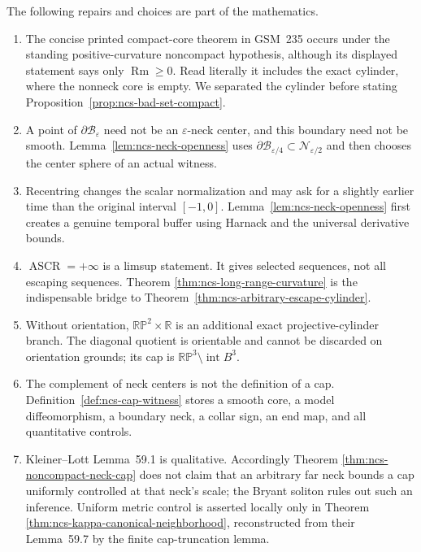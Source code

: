 \documentclass[10pt]{coll-l}
\newcommand{\R}{\mathbb{R}}
\theoremstyle{definition}
\theoremstyle{remark}
\numberwithin{section}{chapter}
\numberwithin{equation}{chapter}
\newcommand{\ASCR}{\operatorname{ASCR}}
\newcommand{\Rm}{\operatorname{Rm}}
\begin{document}
The following repairs and choices are part of the mathematics.
\begin{enumerate}
\item The concise printed compact-core theorem in GSM~235 occurs under the
      standing positive-curvature noncompact hypothesis, although its
      displayed statement says only $\Rm\geq0$.  Read literally it includes
      the exact cylinder, where the nonneck core is empty.  We separated the
      cylinder before stating Proposition~\ref{prop:ncs-bad-set-compact}.

\item A point of $\partial\mathscr B_\varepsilon$ need not be an
      $\varepsilon$-neck center, and this boundary need not be smooth.
      Lemma~\ref{lem:ncs-neck-openness} uses
      $\partial\mathscr B_{\varepsilon/4}\subset
       \mathscr N_{\varepsilon/2}$ and then chooses the center sphere of an
      actual witness.

\item Recentring changes the scalar normalization and may ask for a
      slightly earlier time than the original interval $[-1,0]$.
      Lemma~\ref{lem:ncs-neck-openness} first creates a genuine temporal
      buffer using Harnack and the universal derivative bounds.

\item $\ASCR=+\infty$ is a limsup statement.  It gives selected sequences,
      not all escaping sequences.  Theorem
      \ref{thm:ncs-long-range-curvature} is the indispensable bridge to
      Theorem~\ref{thm:ncs-arbitrary-escape-cylinder}.

\item Without orientation, $\mathbb{RP}^2\times\R$ is an additional exact
      projective-cylinder branch.  The diagonal quotient is orientable and
      cannot be discarded on orientation grounds; its cap is
      $\mathbb{RP}^3\setminus\operatorname{int}B^3$.

\item The complement of neck centers is not the definition of a cap.
      Definition~\ref{def:ncs-cap-witness} stores a smooth core, a model
      diffeomorphism, a boundary neck, a collar sign, an end map, and all
      quantitative controls.

\item Kleiner--Lott Lemma~59.1 is qualitative.  Accordingly Theorem
      \ref{thm:ncs-noncompact-neck-cap} does not claim that an arbitrary
      far neck bounds a cap uniformly controlled at that neck's scale; the
      Bryant soliton rules out such an inference.  Uniform metric control
      is asserted locally only in Theorem
      \ref{thm:ncs-kappa-canonical-neighborhood}, reconstructed from their
      Lemma~59.7 by the finite cap-truncation lemma.


\end{enumerate}
\end{document}
